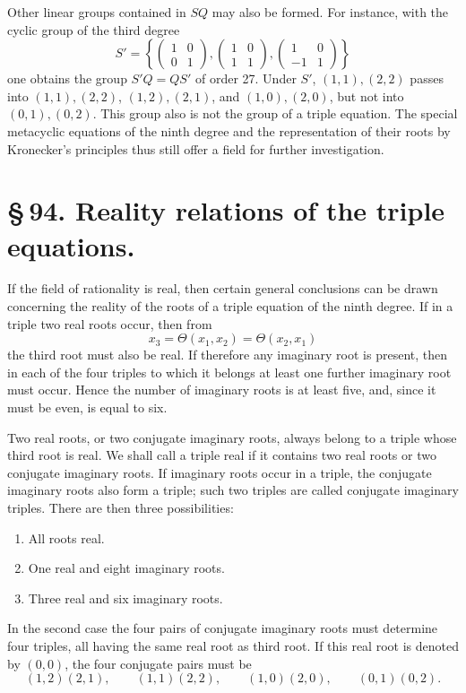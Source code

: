 \documentclass[11pt]{article}
\providecommand{\mat}[4]{\begin{pmatrix}#1&#2\\#3&#4\end{pmatrix}}
\providecommand{\mat}[4]{\begin{pmatrix}#1&#2\\#3&#4\end{pmatrix}}
\begin{document}
Other linear groups contained in \(SQ\) may also be formed. For instance, with the cyclic group of the third degree
\[
 S'=\left\{
 \mat{1}{0}{0}{1},
 \mat{1}{0}{1}{1},
 \mat{1}{0}{-1}{1}
 \right\}
\]
one obtains the group \(S'Q=QS'\) of order 27. Under \(S'\), \((1,1),(2,2)\) passes into \((1,1),(2,2)\), \((1,2),(2,1)\), and \((1,0),(2,0)\), but not into \((0,1),(0,2)\). This group also is not the group of a triple equation. The special metacyclic equations of the ninth degree and the representation of their roots by Kronecker's principles thus still offer a field for further investigation.

\section*{\S\,94. Reality relations of the triple equations.}

If the field of rationality is real, then certain general conclusions can be drawn concerning the reality of the roots of a triple equation of the ninth degree. If in a triple two real roots occur, then from
\[
 x_3=\Theta(x_1,x_2)=\Theta(x_2,x_1)
\]
the third root must also be real. If therefore any imaginary root is present, then in each of the four triples to which it belongs at least one further imaginary root must occur. Hence the number of imaginary roots is at least five, and, since it must be even, is equal to six.

Two real roots, or two conjugate imaginary roots, always belong to a triple whose third root is real. We shall call a triple real if it contains two real roots or two conjugate imaginary roots. If imaginary roots occur in a triple, the conjugate imaginary roots also form a triple; such two triples are called conjugate imaginary triples. There are then three possibilities:
\begin{enumerate}[label=\arabic*.]
\item All roots real.
\item One real and eight imaginary roots.
\item Three real and six imaginary roots.
\end{enumerate}

In the second case the four pairs of conjugate imaginary roots must determine four triples, all having the same real root as third root. If this real root is denoted by \((0,0)\), the four conjugate pairs must be
\[
(1,2)(2,1),\qquad (1,1)(2,2),\qquad (1,0)(2,0),\qquad (0,1)(0,2).
\]
\end{document}
